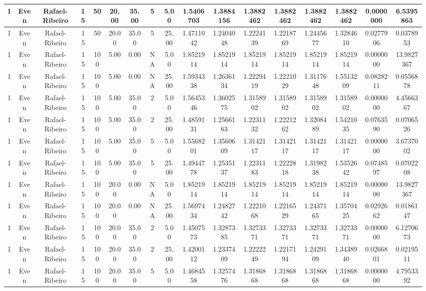 \documentclass[a4paper]{article}
\begin{document}
\begin{center}
\begin{tabular}{ | c | c | c | c | c | c | c | c | c | c | c | c | c | c | c | c | c | }
		\hline
		1	&	Even	&	Rafael-Ribeiro	&	15	&	50	&	20.00	&	35.00	&	5	&	5.00	&	1.5406703	&	1.3884156	&	1.3882462	&	1.3882462	&	1.3882462	&	1.3882462	&	0.0000000	&	6.5395863 \\
		\hline
		1	&	Even	&	Rafael-Ribeiro	&	15	&	50	&	20.00	&	35.00	&	5	&	25.00	&	1.4711042	&	1.2404048	&	1.2224139	&	1.2218769	&	1.2445677	&	1.3284610	&	0.0277906	&	0.0378953 \\
		\hline
		1	&	Even	&	Rafael-Ribeiro	&	15	&	100	&	5.00	&	0.00	&	NA	&	5.00	&	1.8521914	&	1.8521914	&	1.8521914	&	1.8521914	&	1.8521914	&	1.8521914	&	0.0000000	&	13.9827367 \\
		\hline
		1	&	Even	&	Rafael-Ribeiro	&	15	&	100	&	5.00	&	0.00	&	NA	&	25.00	&	1.5934338	&	1.2636134	&	1.2229419	&	1.2221029	&	1.3117648	&	1.5513209	&	0.0828211	&	0.0556878 \\
		\hline
		1	&	Even	&	Rafael-Ribeiro	&	15	&	100	&	5.00	&	35.00	&	2	&	5.00	&	1.5645346	&	1.3602575	&	1.3158902	&	1.3158902	&	1.3158902	&	1.3158902	&	0.0000000	&	4.4566367 \\
		\hline
		1	&	Even	&	Rafael-Ribeiro	&	15	&	100	&	5.00	&	35.00	&	2	&	25.00	&	1.4859131	&	1.2566163	&	1.2231132	&	1.2221262	&	1.3208489	&	1.5421035	&	0.0763590	&	0.0706526 \\
		\hline
		1	&	Even	&	Rafael-Ribeiro	&	15	&	100	&	5.00	&	35.00	&	5	&	5.00	&	1.5568201	&	1.3560609	&	1.3142117	&	1.3142117	&	1.3142117	&	1.3142117	&	0.0000000	&	3.6737002 \\
		\hline
		1	&	Even	&	Rafael-Ribeiro	&	15	&	100	&	5.00	&	35.00	&	5	&	25.00	&	1.4944778	&	1.2535137	&	1.2231183	&	1.2222818	&	1.3198238	&	1.5352642	&	0.0748597	&	0.0702208 \\
		\hline
		1	&	Even	&	Rafael-Ribeiro	&	15	&	100	&	20.00	&	0.00	&	NA	&	5.00	&	1.8521914	&	1.8521914	&	1.8521914	&	1.8521914	&	1.8521914	&	1.8521914	&	0.0000000	&	13.9827367 \\
		\hline
		1	&	Even	&	Rafael-Ribeiro	&	15	&	100	&	20.00	&	0.00	&	NA	&	25.00	&	1.5697434	&	1.2482742	&	1.2221068	&	1.2216529	&	1.2437165	&	1.3570425	&	0.0292662	&	0.0186147 \\
		\hline
		1	&	Even	&	Rafael-Ribeiro	&	15	&	100	&	20.00	&	35.00	&	2	&	5.00	&	1.4507573	&	1.3287385	&	1.3273371	&	1.3273371	&	1.3273371	&	1.3273371	&	0.0000000	&	6.1270673 \\
		\hline
		1	&	Even	&	Rafael-Ribeiro	&	15	&	100	&	20.00	&	35.00	&	2	&	25.00	&	1.4200112	&	1.2337409	&	1.2222249	&	1.2217194	&	1.2429109	&	1.3438940	&	0.0266801	&	0.0219511 \\
		\hline
		1	&	Even	&	Rafael-Ribeiro	&	15	&	100	&	20.00	&	35.00	&	5	&	5.00	&	1.4684558	&	1.3257476	&	1.3186868	&	1.3186868	&	1.3186868	&	1.3186868	&	0.0000000	&	4.7953392 \\

\end{tabular}
\end{center}
\end{document}
